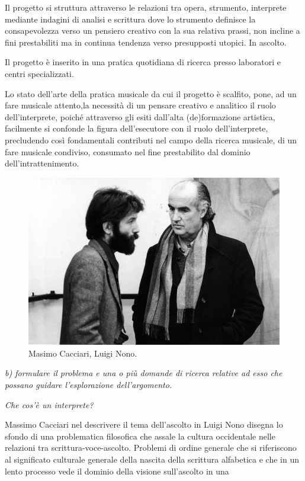 \documentclass{gs-adonis}
\begin{document}
Il progetto si struttura attraverso le relazioni tra opera, strumento,
interprete mediante indagini di analisi e scrittura dove lo strumento definisce
la consapevolezza verso un pensiero creativo con la sua relativa prassi, non
incline a fini prestabiliti ma in continua tendenza verso presupposti utopici.
In ascolto.

Il progetto è inserito in una pratica quotidiana di ricerca presso laboratori
e centri specializzati.

Lo stato dell'arte della pratica musicale da cui il progetto è scalfito, pone,
ad un fare musicale attento,la necessità di un pensare creativo e analitico il
ruolo dell'interprete, poiché attraverso gli esiti dall'alta (de)formazione
artistica, facilmente si confonde la figura dell'esecutore con il ruolo
dell'interprete, precludendo così fondamentali contributi nel campo della
ricerca musicale, di un fare musicale condiviso, consumato nel fine
prestabilito dal dominio dell'intrattenimento.

\begin{figure}[ht]
  \centering
  \includegraphics[width=\linewidth]{images/luigi-nono-massimo-cacciari.jpg}
  \captionsetup{width=.81\linewidth}
  \caption{Masimo Cacciari, Luigi Nono.}
  \label{cacciari}
\end{figure}


\emph{b) formulare il problema e una o più domande di ricerca relative ad esso che possano guidare l’esplorazione dell’argomento.}

\emph{Che cos'è un interprete?}

Massimo Cacciari nel descrivere il tema dell'ascolto in Luigi Nono \cite{Cacciari1995} disegna lo sfondo di una problematica filosofica che assale
la cultura occidentale nelle relazioni tra scrittura-voce-ascolto. Problemi di ordine generale che si riferiscono al significato culturale generale della nascita della scrittura alfabetica e che in un lento processo vede il dominio della visione sull'ascolto in una
\end{document}
